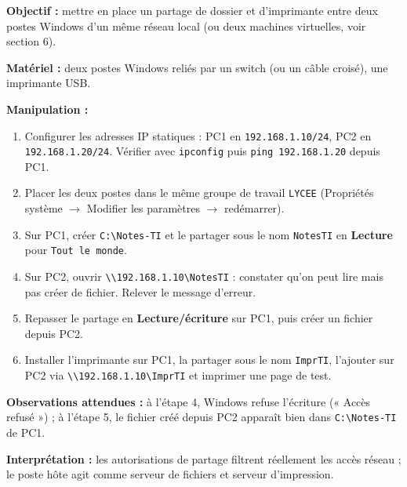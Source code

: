 \documentclass[11pt]{article}
\begin{document}
\begin{experience}
\textbf{Objectif :} mettre en place un partage de dossier et d'imprimante entre deux postes Windows d'un même réseau local (ou deux machines virtuelles, voir section 6).

\textbf{Matériel :} deux postes Windows reliés par un switch (ou un câble croisé), une imprimante USB.

\textbf{Manipulation :}
\begin{enumerate}
  \item Configurer les adresses IP statiques : PC1 en \texttt{192.168.1.10/24}, PC2 en \texttt{192.168.1.20/24}. Vérifier avec \texttt{ipconfig} puis \texttt{ping 192.168.1.20} depuis PC1.
  \item Placer les deux postes dans le même groupe de travail \texttt{LYCEE} (Propriétés système $\rightarrow$ Modifier les paramètres $\rightarrow$ redémarrer).
  \item Sur PC1, créer \texttt{C:\textbackslash Notes-TI} et le partager sous le nom \texttt{NotesTI} en \textbf{Lecture} pour \texttt{Tout le monde}.
  \item Sur PC2, ouvrir \texttt{\textbackslash\textbackslash 192.168.1.10\textbackslash NotesTI} : constater qu'on peut lire mais pas créer de fichier. Relever le message d'erreur.
  \item Repasser le partage en \textbf{Lecture/écriture} sur PC1, puis créer un fichier depuis PC2.
  \item Installer l'imprimante sur PC1, la partager sous le nom \texttt{ImprTI}, l'ajouter sur PC2 via \texttt{\textbackslash\textbackslash 192.168.1.10\textbackslash ImprTI} et imprimer une page de test.
\end{enumerate}
\textbf{Observations attendues :} à l'étape 4, Windows refuse l'écriture (« Accès refusé ») ; à l'étape 5, le fichier créé depuis PC2 apparaît bien dans \texttt{C:\textbackslash Notes-TI} de PC1.

\textbf{Interprétation :} les autorisations de partage filtrent réellement les accès réseau ; le poste hôte agit comme serveur de fichiers et serveur d'impression.
\end{experience}
\end{document}
